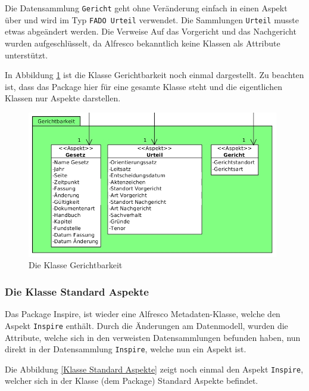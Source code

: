 Die Datensammlung \texttt{Gericht} geht ohne Ver\"anderung einfach in einen Aspekt \"uber und wird im Typ \texttt{FADO Urteil} verwendet. Die Sammlungen \texttt{Urteil} musste etwas abge\"andert werden. Die Verweise Auf das Vorgericht und das Nachgericht wurden aufgeschl\"usselt, da Alfresco bekanntlich keine Klassen als Attribute unterst\"utzt.

In Abbildung \ref{Klasse Gerichtbarkeit} ist die Klasse Gerichtbarkeit noch einmal dargestellt. Zu beachten ist, dass das Package hier f\"ur eine gesamte Klasse steht und die eigentlichen Klassen nur Aspekte darstellen.

\begin{figure}[!ht]
\centering
\includegraphics[width=11cm]{Bilder/AlfrescoModell/Gerichtbarkeit.jpg}
\caption{Die Klasse Gerichtbarkeit}
\label{Klasse Gerichtbarkeit}
\centering
\end{figure}

\subsubsection{Die Klasse Standard Aspekte}\label{Die Klasse Standard Aspekte}
Das Package Inspire, ist wieder eine Alfresco Metadaten-Klasse, welche den Aspekt \texttt{Inspire} enth\"alt. Durch die \"Anderungen am Datenmodell, wurden die Attribute, welche sich in den verweisten Datensammlungen befunden haben, nun direkt in der Datensammlung \texttt{Inspire}, welche nun ein Aspekt ist. 

Die Abbildung \ref{Klasse Standard Aspekte} zeigt noch einmal den Aspekt \texttt{Inspire}, welcher sich in der Klasse (dem Package) Standard Aspekte befindet.

